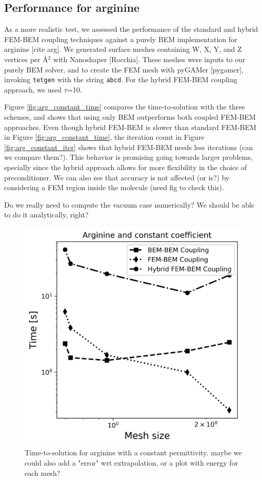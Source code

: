 \subsection*{\sffamily \large Performance for arginine}

As a more realistic test, we assessed the performance of the standard and hybrid FEM-BEM coupling techniques against a purely BEM implementation for arginine [cite arg]. 
We generated surface meshes containing W, X, Y, and Z vertices per \AA$^2$ with Nanoshaper [Rocchia].
These meshes were inputs to our purely BEM solver, and to create the FEM mesh with pyGAMer [pygamer], invoking \texttt{tetgen} with the string \texttt{abcd}.
For the hybrid FEM-BEM coupling approach, we used $\tau$=10.

Figure \ref{fig:arg_constant_time} compares the time-to-solution with the three schemes, and shows that using only BEM outperforms both coupled FEM-BEM approaches.
Even though hybrid FEM-BEM is slower than standard FEM-BEM in Figure \ref{fig:arg_constant_time}, the iteration count in Figure \ref{fig:arg_constant_iter} shows that hybrid FEM-BEM needs less iterations (can we compare them?). 
This behavior is promising going towards larger problems, specially since the hybrid approach allows for more flexibility in the choice of preconditioner.
We can also see that accuracy is not affected (or is?) by considering a FEM region inside the molecule (need fig to check this).

Do we really need to compute the vacuum case numerically? We should be able to do it analytically, right?

\begin{figure}
\centering
  \includegraphics[width=0.6\linewidth]{Arginine_const_coeff_time.png}
\caption{Time-to-solution for arginine with a constant permittivity. %
maybe we could also add a "error" wrt extrapolation, or a plot with energy for each mesh?}
\label{fig:arg_contant_time}
\end{figure}


